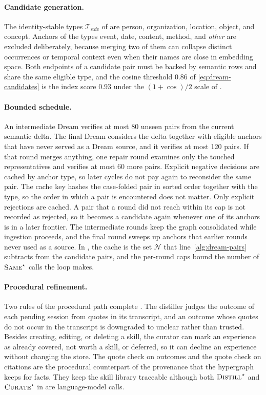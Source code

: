 \paragraph{Candidate generation.}
The identity-stable types \(\mathcal T_{\mathrm{safe}}\) of
 are person, organization, location, object, and concept.
Anchors of the types event, date, content, method, and \emph{other} are
excluded deliberately, because merging two of them can collapse distinct occurrences or temporal
context even when their names are close in embedding space. Both endpoints of a candidate pair must be backed by semantic rows and
share the same eligible type, and the cosine threshold \(0.86\) of
\eqref{eq:dream-candidates} is the index score \(0.93\) under the
\((1+\cos)/2\) scale of .

\paragraph{Bounded schedule.}
An intermediate Dream verifies at most 80 unseen pairs from the current semantic
delta. The final Dream considers the delta together with eligible anchors that
have never served as a Dream source, and it verifies at most 120 pairs. If that
round merges anything, one repair round examines only the touched
representatives and verifies at most 60 more pairs. Explicit negative decisions
are cached by anchor type, so later cycles do not
pay again to reconsider the same pair. The cache key hashes the case-folded
pair in sorted order together with the type, so the
order in which a pair is encountered does not matter. Only explicit rejections are cached. A pair that a round did not reach within
its cap is not recorded as rejected, so it becomes a candidate again whenever one of
its anchors is in a later frontier.
The intermediate rounds keep the graph consolidated while ingestion proceeds,
and the final round sweeps up anchors that earlier rounds never used as a source. In , the cache is the set
\(\mathcal N\) that line~\ref{alg:dream-pairs} subtracts from the candidate
pairs, and the per-round caps bound the number of \(\textsc{Same}^\star\) calls
the loop makes.

\paragraph{Procedural refinement.}
Two rules of the procedural path complete . The distiller
judges the outcome of each pending session from quotes in its transcript, and an
outcome whose quotes do not occur in the transcript is downgraded to unclear
rather than trusted. Besides creating, editing, or deleting a skill, the curator
can mark an experience as already covered, not worth a skill, or deferred, so it
can decline an experience without changing the store. The quote check on
outcomes and the quote check on citations are the procedural counterpart of the
provenance that the hypergraph keeps for facts. They keep the skill library
traceable although both \(\textsc{Distill}^\star\) and \(\textsc{Curate}^\star\)
in  are language-model calls.

